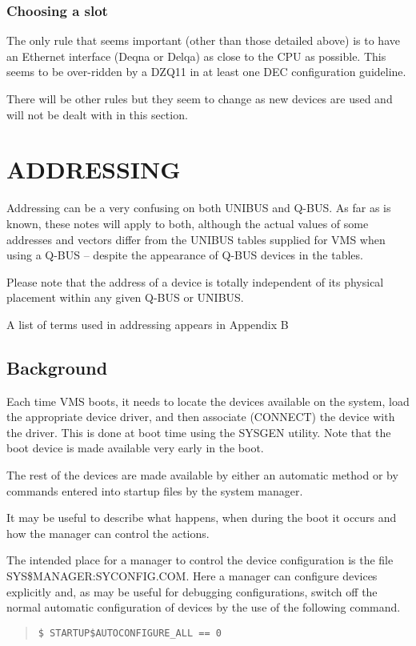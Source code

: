 \subsubsection{Choosing a slot}

The only rule that seems important (other than those detailed above)
 is to have an Ethernet interface (Deqna or Delqa) as close to the CPU
as possible.
This seems to be over-ridden by a DZQ11 in at least one DEC configuration
guideline.

There will be other rules but they seem to change as new devices are used
and will not be dealt with in this section.

\section{ADDRESSING}

Addressing can be a very confusing on both UNIBUS and Q-BUS.
As far as is known, these notes will apply to both, although the actual values
of some addresses and vectors differ from the UNIBUS tables supplied for
VMS when using a Q-BUS -- despite the appearance of Q-BUS devices in the
tables.

Please note that the address of a device is totally independent of its
physical placement within any given Q-BUS or UNIBUS.

A list of terms used in addressing appears in Appendix B

\subsection{Background}

Each time VMS boots, it needs to locate the devices available on the system,
load the appropriate device driver, and then associate (CONNECT) the device
with the driver.
This is done at boot time using the SYSGEN utility.
Note that the boot device is made available very early in the boot.

The rest of the devices are made available by either an automatic method
or by commands entered into startup files by the system manager.

It may be useful to describe what happens, when during the boot it occurs
and how the manager can control the actions.

\begin{sloppypar}
The intended place for a manager to control the device configuration is the
file SYS\$MANAGER:SYCONFIG.COM.
Here a manager can configure devices explicitly and, as may be useful for
debugging configurations, switch off the normal automatic configuration
of devices by the use of the following command.
\end{sloppypar}
\begin{quote}
\begin{verbatim}
$ STARTUP$AUTOCONFIGURE_ALL == 0
\end{verbatim}
\end{quote}

